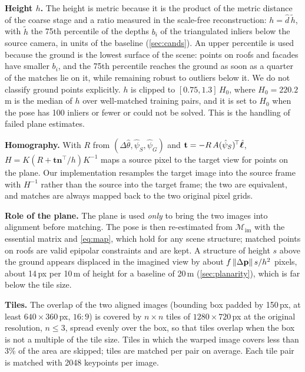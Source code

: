 \noindent\textbf{Height $h$.} The height is metric because it is the product of the metric distance of the coarse stage and a ratio measured in the scale-free reconstruction: $h=\hat d\,\tilde h$, with $\tilde h$ the 75th percentile of the depths $b_i$ of the triangulated inliers below the source camera, in units of the baseline (\cref{sec:cands}). An upper percentile is used because the ground is the lowest surface of the scene: points on roofs and facades have smaller $b_i$, and the 75th percentile reaches the ground as soon as a quarter of the matches lie on it, while remaining robust to outliers below it. We do not classify ground points explicitly. $h$ is clipped to $[0.75,1.3]\,H_0$, where $H_0{=}220.2$\,m is the median of $h$ over well-matched training pairs, and it is set to $H_0$ when the pose has 100 inliers or fewer or could not be solved. This is the handling of failed plane estimates.

\noindent\textbf{Homography.} With $R$ from $(\Delta\hat\theta,\hat\psi_S,\hat\psi_G)$ and $\mathbf{t}=-R\,A(\hat\psi_S)^{\!\top}\hat{\bm{\ell}}$, $H=K(R+\mathbf{t}\mathbf{n}^{\!\top}/h)K^{-1}$ maps a source pixel to the target view for points on the plane. Our implementation resamples the target image into the source frame with $H^{-1}$ rather than the source into the target frame; the two are equivalent, and matches are always mapped back to the two original pixel grids.

\noindent\textbf{Role of the plane.} The plane is used \emph{only} to bring the two images into alignment before matching. The pose is then re-estimated from $\mathcal{M}_{\mathrm{im}}$ with the essential matrix and \cref{eq:map}, which hold for any scene structure; matched points on roofs are valid epipolar constraints and are kept. A structure of height $s$ above the ground appears displaced in the imagined view by about $f\,\|\Delta\mathbf{p}\|\,s/h^2$ pixels, \ie about 14\,px per 10\,m of height for a baseline of 20\,m (\cref{sec:planarity}), which is far below the tile size.

\noindent\textbf{Tiles.} The overlap of the two aligned images (bounding box padded by 150\,px, at least $640{\times}360$\,px, $16{:}9$) is covered by $n{\times}n$ tiles of $1280{\times}720$\,px at the original resolution, $n\le3$, spread evenly over the box, so that tiles overlap when the box is not a multiple of the tile size. Tiles in which the warped image covers less than 3\% of the area are skipped; \imTilesMean{} tiles are matched per pair on average. Each tile pair is matched with 2048 keypoints per image.

